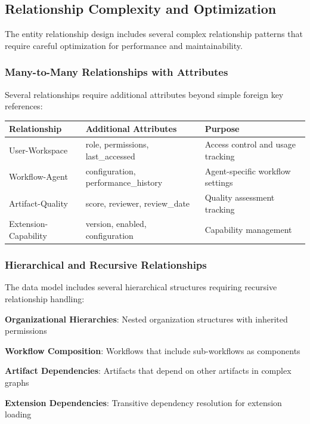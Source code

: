 \subsection*{Relationship Complexity and Optimization}

The entity relationship design includes several complex relationship patterns that require careful optimization for performance and maintainability.

\subsubsection*{Many-to-Many Relationships with Attributes}

Several relationships require additional attributes beyond simple foreign key references:

\begin{center}
\begin{tabular}{@{}lll@{}}
\toprule
\textbf{Relationship} & \textbf{Additional Attributes} & \textbf{Purpose} \\
\midrule
User-Workspace & role, permissions, last\_accessed & Access control and usage tracking \\
Workflow-Agent & configuration, performance\_history & Agent-specific workflow settings \\
Artifact-Quality & score, reviewer, review\_date & Quality assessment tracking \\
Extension-Capability & version, enabled, configuration & Capability management \\
\bottomrule
\end{tabular}
\end{center}

\subsubsection*{Hierarchical and Recursive Relationships}

The data model includes several hierarchical structures requiring recursive relationship handling:

\begin{expandedlist}
    \item \textbf{Organizational Hierarchies}: Nested organization structures with inherited permissions
    \item \textbf{Workflow Composition}: Workflows that include sub-workflows as components
    \item \textbf{Artifact Dependencies}: Artifacts that depend on other artifacts in complex graphs
    \item \textbf{Extension Dependencies}: Transitive dependency resolution for extension loading
\end{expandedlist}

